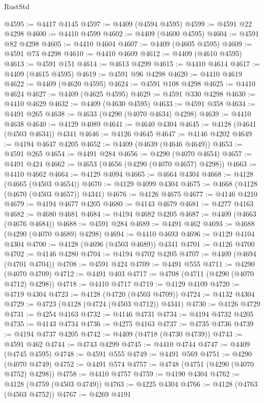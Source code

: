 \begin{lexlean}{RustStd}
\begin{coremodule}
@4595 := @4417 @4145
@4597 := @4409 (@4594 @4595)
@4599 := @4591 @22 @4298
@4600 := @4410 @4599
@4602 := @4409 (@4600 @4595)
@4604 := @4591 @82 @4298
@4605 := @4410 @4604
@4607 := @4409 (@4605 @4595)
@4609 := @4591 @73 @4298
@4610 := @4410 @4609
@4612 := @4409 (@4610 @4595)
@4613 := @4591 @151
@4614 := @4613 @4299
@4615 := @4410 @4614
@4617 := @4409 (@4615 @4595)
@4619 := @4591 @96 @4298
@4620 := @4410 @4619
@4622 := @4409 (@4620 @4595)
@4624 := @4591 @108 @4298
@4625 := @4410 @4624
@4627 := @4409 (@4625 @4595)
@4629 := @4591 @330 @4298
@4630 := @4410 @4629
@4632 := @4409 (@4630 @4595)
@4633 := @4591 @358
@4634 := @4491 @265
@4638 := @4633 (@4290 (@4070 @4634) @4298)
@4639 := @4410 @4638
@4640 := @4129 @4089
@4641 := @4640 @4304
@4645 := @4128 (@4641 (@4503 @4634)) @4341
@4646 := @4126 @4645
@4647 := @4146 @4202
@4649 := @4194 @4647 @4205
@4652 := @4409 (@4639 (@4646 @4649))
@4653 := @4591 @265
@4654 := @4491 @284
@4656 := @4290 (@4070 @4654)
@4657 := @4491 @424
@4662 := @4653 (@4656 (@4290 (@4070 @4657) @4298))
@4663 := @4410 @4662
@4664 := @4129 @4094
@4665 := @4664 @4304
@4668 := @4128 (@4665 (@4503 @4654))
@4670 := @4129 @4099 @4304
@4675 := @4668 (@4128 (@4670 (@4503 @4657)) @4341)
@4676 := @4126 @4675
@4677 := @4146 @4210
@4679 := @4194 @4677 @4205
@4680 := @4143 @4679
@4681 := @4277 @4163
@4682 := @4680 @4681
@4684 := @4194 @4682 @4205
@4687 := @4409 (@4663 (@4676 @4684))
@4688 := @4591 @284
@4689 := @4491 @462
@4693 := @4688 (@4290 (@4070 @4689) @4298)
@4694 := @4410 @4693
@4696 := @4129 @4104 @4304
@4700 := @4128 (@4696 (@4503 @4689)) @4341
@4701 := @4126 @4700
@4702 := @4146 @4280
@4704 := @4194 @4702 @4205
@4707 := @4409 (@4694 (@4701 @4704))
@4708 := @4591 @424
@4709 := @4491 @555
@4711 := @4290 (@4070 @4709)
@4712 := @4491 @403
@4717 := @4708 (@4711 (@4290 (@4070 @4712) @4298))
@4718 := @4410 @4717
@4719 := @4129 @4109
@4720 := @4719 @4304
@4723 := @4128 (@4720 (@4503 @4709))
@4724 := @4132 @4304
@4729 := @4723 (@4128 (@4724 (@4503 @4712)) @4341)
@4730 := @4126 @4729
@4731 := @4254 @4163
@4732 := @4146 @4731
@4734 := @4194 @4732 @4205
@4735 := @4143 @4734
@4736 := @4275 @4163
@4737 := @4735 @4736
@4739 := @4194 @4737 @4205
@4742 := @4409 (@4718 (@4730 @4739))
@4743 := @4591 @462
@4744 := @4743 @4299
@4745 := @4410 @4744
@4747 := @4409 (@4745 @4595)
@4748 := @4591 @555
@4749 := @4491 @569
@4751 := @4290 (@4070 @4749)
@4752 := @4491 @574
@4757 := @4748 (@4751 (@4290 (@4070 @4752) @4298))
@4758 := @4410 @4757
@4759 := @4190 @4304
@4762 := @4128 (@4759 (@4503 @4749))
@4763 := @4225 @4304
@4766 := @4128 (@4763 (@4503 @4752))
@4767 := @4269 @4191

\end{coremodule}
\end{lexlean}
